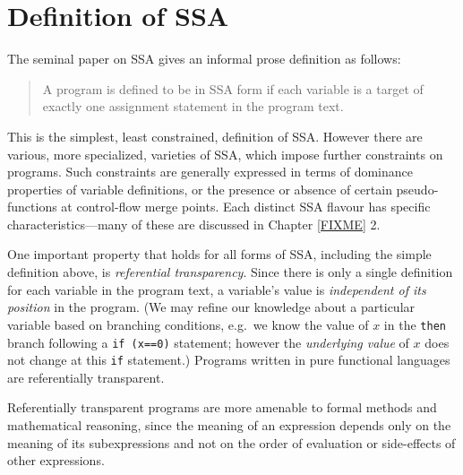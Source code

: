 
\section{Definition of SSA}


The seminal paper on SSA 
\cite{cytron91efficiently}
gives an informal prose
definition as follows:

\begin{quotation}
A program is defined to be in SSA
form if each variable is a target of
exactly one assignment statement in the
program text.
\end{quotation}



This is the simplest,
least constrained, definition of SSA. However
there are various, more specialized, varieties of SSA,
which impose further constraints on programs.
Such constraints are generally expressed in terms
of dominance properties of variable definitions, or
the presence or absence of certain 
pseudo-functions at control-flow merge points.
Each distinct SSA flavour has specific characteristics---many of
these are discussed in Chapter \ref{FIXME} 2.

One important property that holds for all forms of SSA,
including the simple definition above, is 
\emph{referential transparency}.
Since there is only a single definition for each variable
in the program text, a variable's value
is \textit{independent of
its position} in the program.
(We may refine our knowledge about a particular variable
based on branching conditions, e.g.\ we know the value of $x$ in the
\texttt{then} branch following a \texttt{if (x==0)} statement; however the
\textit{underlying value} of $x$
does not change at this \texttt{if} statement.)
Programs written in pure functional languages
are referentially transparent.

Referentially transparent programs are more amenable to 
formal methods and mathematical reasoning, since
the meaning of an expression depends only on the
meaning of its subexpressions
and not on the order of evaluation or
side-effects of other expressions.

